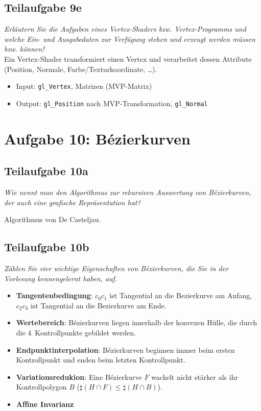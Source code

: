 \documentclass[a4paper]{scrartcl}
\begin{document}
\subsection*{Teilaufgabe 9e}
\textit{Erläutern Sie die Aufgaben eines Vertex-Shaders bzw. Vertex-Programms
und welche Ein- und Ausgabedaten zur Verfügung stehen und erzeugt werden müssen
bzw. können!}\\
Ein Vertex-Shader transformiert einen Vertex und verarbeitet dessen Attribute
(Position, Normale, Farbe/Texturkoordinate, \dots).

\begin{itemize}
    \item Input: \texttt{gl\_Vertex}, Matrizen (MVP-Matrix)
    \item Output: \texttt{gl\_Position} nach MVP-Transformation, \texttt{gl\_Normal}
\end{itemize}


\section*{Aufgabe 10: Bézierkurven}
\subsection*{Teilaufgabe 10a}
\textit{Wie nennt man den Algorithmus zur rekursiven Auswertung von
Bézierkurven, der auch eine grafische Repräsentation hat?}

Algorithmus von De Casteljau.

\clearpage
\subsection*{Teilaufgabe 10b}
\textit{Zählen Sie vier wichtige Eigenschaften von Bézierkurven, die Sie in der
Vorlesung kennengelernt haben, auf.}

\begin{itemize}
    \item \textbf{Tangentenbedingung}:
          $c_0 c_1$ ist Tangential an die Bezierkurve am Anfang,
          $c_2 c_3$ ist Tangential an die Bezierkurve am Ende.
    \item \textbf{Wertebereich}: Bézierkurven liegen innerhalb der konvexen
          Hülle, die durch die 4~Kontrollpunkte gebildet werden.
    \item \textbf{Endpunktinterpolation}: Bézierkurven beginnen immer beim
          ersten Kontrollpunkt und enden beim letzten Kontrollpunkt.
    \item \textbf{Variationsredukion}: Eine Bézierkurve $F$ wackelt nicht stärker
          als ihr Kontrollpolygon $B$ ($\sharp (H \cap F) \leq \sharp (H \cap B)$).
    \item \textbf{Affine Invarianz}
\end{itemize}
\end{document}
